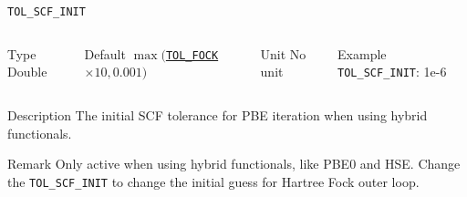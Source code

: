     \begin{frame}[allowframebreaks]{\texttt{TOL\_SCF\_INIT}} \label{TOL_SCF_INIT}
    \vspace*{-12pt}
    \begin{columns}
    \begin{block}{Type}
    Double
    \end{block}
    
    \begin{block}{Default}
    $\max($\hyperlink{TOL_FOCK}{\texttt{TOL\_FOCK}}$\times 10,0.001)$
    \end{block}
    
    \begin{block}{Unit}
    No unit
    \end{block}
    
    \begin{block}{Example}
    \texttt{TOL\_SCF\_INIT}: 1e-6
    \end{block}
    \end{columns}
    
    \begin{block}{Description}
    The initial SCF tolerance for PBE iteration when using hybrid functionals. 
    \end{block}
    
    \begin{block}{Remark}
    Only active when using hybrid functionals, like PBE0 and HSE. Change the \texttt{TOL\_SCF\_INIT} to change the initial guess for Hartree Fock outer loop.
    \end{block}
    
    \end{frame}
    
